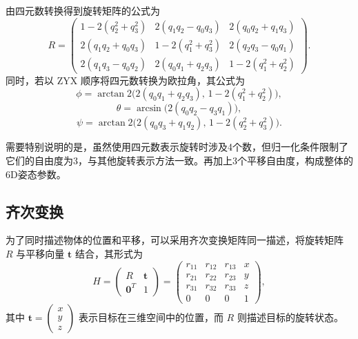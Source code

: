 由四元数转换得到旋转矩阵的公式为
\begin{equation}
	R = \begin{pmatrix}
		1-2(q_2^2+q_3^2) & 2(q_1q_2 - q_0q_3) & 2(q_0q_2+q_1q_3) \\
		2(q_1q_2+q_0q_3) & 1-2(q_1^2+q_3^2) & 2(q_2q_3 - q_0q_1) \\
		2(q_1q_3 - q_0q_2) & 2(q_0q_1+q_2q_3) & 1-2(q_1^2+q_2^2)
	\end{pmatrix}.
\end{equation}
同时，若以 ZYX 顺序将四元数转换为欧拉角，其公式为
\begin{equation}
	\phi = \arctan2\bigl(2(q_0q_1+q_2q_3),\, 1-2(q_1^2+q_2^2)\bigr),
\end{equation}
\begin{equation}
	\theta = \arcsin\bigl(2(q_0q_2-q_3q_1)\bigr),
\end{equation}
\begin{equation}
	\psi = \arctan2\bigl(2(q_0q_3+q_1q_2),\, 1-2(q_2^2+q_3^2)\bigr).
\end{equation}

需要特别说明的是，虽然使用四元数表示旋转时涉及4个数，但归一化条件限制了它们的自由度为3，与其他旋转表示方法一致。再加上3个平移自由度，构成整体的6D姿态参数。

\subsection{齐次变换}

为了同时描述物体的位置和平移，可以采用齐次变换矩阵同一描述，将旋转矩阵 $R$ 与平移向量 $\mathbf{t}$ 结合，其形式为
\begin{equation}
	H = \begin{pmatrix}
		R & \mathbf{t} \\
		\mathbf{0}^T & 1
	\end{pmatrix} =
	\begin{pmatrix}
		r_{11} & r_{12} & r_{13} & x \\
		r_{21} & r_{22} & r_{23} & y \\
		r_{31} & r_{32} & r_{33} & z \\
		0      & 0      & 0      & 1
	\end{pmatrix},
\end{equation}
其中 $\mathbf{t} = \begin{pmatrix} x \\ y \\ z \end{pmatrix}$ 表示目标在三维空间中的位置，而 $R$ 则描述目标的旋转状态。


